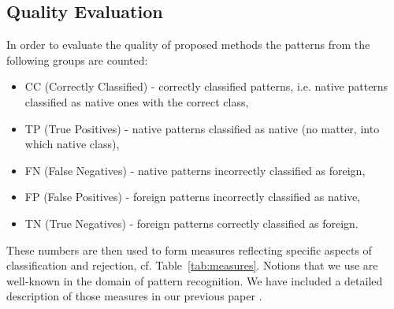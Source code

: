 \documentclass{llncs}
\begin{document}
\subsection{Quality Evaluation}

In order to evaluate the quality of proposed methods the patterns from the following groups are counted:
\begin{itemize}
\item CC  (Correctly Classified) - correctly classified patterns, i.e. native patterns classified as native ones with the correct class,
\item TP  (True Positives) - native patterns classified as native (no matter, into which native class),
\item FN  (False Negatives) - native patterns incorrectly classified as foreign,
\item FP  (False Positives) - foreign patterns incorrectly classified as native,
\item TN  (True Negatives) - foreign patterns correctly classified as foreign.
\end{itemize}
These numbers are then used to form measures reflecting specific aspects of classification and rejection, cf. Table~\ref{tab:measures}. Notions that we use are well-known in the domain of pattern recognition. We have included a detailed description of those measures in our previous paper \cite{HomendaICAART2015}.
\end{document}
